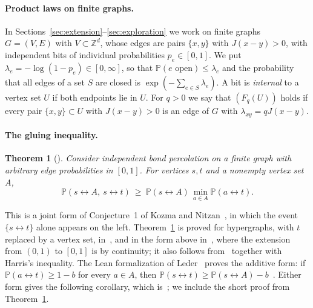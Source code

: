 \documentclass[11pt]{article}
\newtheorem{theorem}{Theorem}[section]
\theoremstyle{definition}
\theoremstyle{remark}
\numberwithin{equation}{section}
\newcommand{\Z}{\mathbb Z}
\newcommand{\Pp}{\mathbb P}
\newcommand{\1}{\mathbf 1}
\newcommand{\lr}{\leftrightarrow}
\begin{document}
\paragraph{Product laws on finite graphs.} In Sections~\ref{sec:extension}--\ref{sec:exploration}
we work on finite graphs $G=(V,E)$ with $V\subset\Z^d$, whose edges are pairs $\{x,y\}$ with
$J(x-y)>0$, with independent bits of individual probabilities $p_e\in[0,1]$. We put
$\lambda_e=-\log(1-p_e)\in[0,\infty]$, so that $\Pp(e\text{ open})\le\lambda_e$ and the probability
that all edges of a set $S$ are closed is $\exp(-\sum_{e\in S}\lambda_e)$. A bit is \emph{internal}
to a vertex set $U$ if both endpoints lie in $U$. For $q>0$ we say that $(F_q(U))$ holds if every
pair $\{x,y\}\subset U$ with $J(x-y)>0$ is an edge of $G$ with $\lambda_{xy}=qJ(x-y)$.

\paragraph{The gluing inequality.}
\begin{theorem}[\cite{OpenAIZ3,BlancRenaudie2026,Gouere2026}]\label{thm:gluing}
Consider independent bond percolation on a finite graph with arbitrary edge probabilities in
$[0,1]$. For vertices $s,t$ and a nonempty vertex set $A$,
\[
\Pp(s\lr A,\ s\lr t)\ \ge\ \Pp(s\lr A)\,\min_{a\in A}\Pp(a\lr t).
\]
\end{theorem}
This is a joint form of Conjecture~1 of Kozma and Nitzan~\cite{KozmaNitzan2024}, in which the event
$\{s\lr t\}$ alone appears on the left. Theorem~\ref{thm:gluing} is proved for hypergraphs, with $t$
replaced by a vertex set, in~\cite[Proposition~2.1]{OpenAIZ3}, and in the form above
in~\cite[Theorem~1]{Gouere2026}, where the extension from $(0,1)$ to $[0,1]$ is by continuity; it also
follows from~\cite[Theorem~1]{BlancRenaudie2026} together with Harris's inequality. The Lean
formalization of Leder~\cite{Leder2026} proves the additive form: if $\Pp(a\lr t)\ge1-b$ for every
$a\in A$, then $\Pp(s\lr t)\ge\Pp(s\lr A)-b$~\cite[Theorem~2.2]{Leder2026}. Either form gives the following
corollary, which is~\cite[Corollary~2.3]{OpenAIZ3}; we include the short proof from
Theorem~\ref{thm:gluing}.
\end{document}
